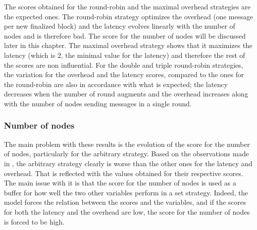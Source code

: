 \begin{table}
\end{table}

The scores obtained for the round-robin and the maximal overhead strategies are
the expected ones. The round-robin strategy optimizes the overhead (one message
per new finalized block) and the latency evolves linearly with the number of
nodes and is therefore bad. The score for the number of nodes will be discussed
later in this chapter. The maximal overhead strategy shows that it maximizes the
latency (which is \(2\), the minimal value for the latency) and therefore the
rest of the scores are non influential.
For the double and triple round-robin strategies, the variation for the overhead
and the latency scores, compared to the ones for the round-robin are also in
accordance with what is expected; the latency decreases when the number of round
augments and the overhead increases along with the number of nodes sending
messages in a single round.

\subsubsection{Number of nodes}
\label{ssec:nbNodes}
The main problem with these results is the evolution of the score for the number
of nodes, particularly for the arbitrary strategy. Based on the observations
made in , the arbitrary strategy clearly is worse than the other ones for
the latency and overhead. That is reflected with the values obtained for their
respective scores. The main issue with it is that the score for the number of
nodes is used as a buffer for how well the two other variables perform in a set
strategy. Indeed, the model forces the relation between the scores and the
variables, and if the scores for both the latency and the overhead are low, the
score for the number of nodes is forced to be high.

